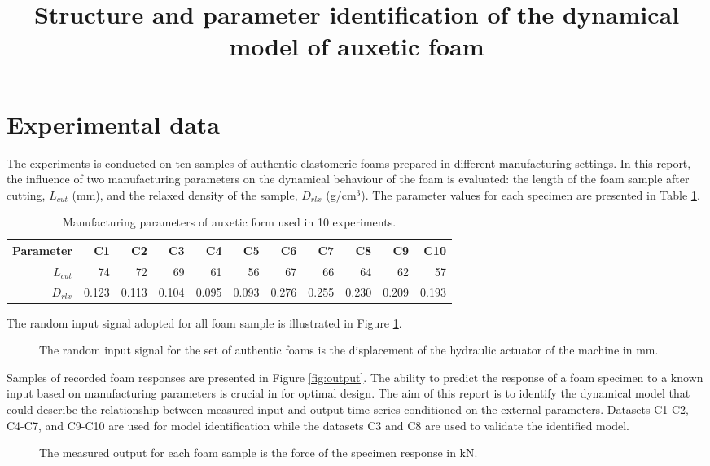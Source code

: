 \documentclass[a4paper,11pt,twoside]{article}
\title{Structure and parameter identification of the dynamical model of auxetic foam}
\theoremstyle{mytheoremstyle}
\begin{document}
	\maketitle
%	
\section{Experimental data}
\par The experiments is conducted on ten samples of authentic elastomeric foams prepared in different manufacturing settings. In this report, the influence of two manufacturing parameters on the dynamical behaviour of the foam is evaluated: the length of the foam sample after cutting, $L_{cut}$ (mm), and the relaxed density of the sample, $D_{rlx}$ (g/cm$^3$). The parameter values for each specimen are presented in Table \ref{tab:externparams}.
\begin{table}[!h]
	\centering
	\caption{Manufacturing parameters of auxetic form used in 10 experiments.}\label{tab:externparams}
	\small
	\begin{tabular}{rrrrrrrrrrr}
		Parameter  & C1 & C2 & C3 & C4 & C5 & C6 & C7 & C8 & C9 & C10 \\ 
		\hline 
		$L_{cut}$ & 74 & 72 & 69 & 61 & 56 & 67 & 66 & 64 & 62 & 57 \\ 
		$D_{rlx}$ & 0.123 & 0.113 & 0.104 & 0.095 & 0.093 & 0.276 & 0.255 & 0.230 & 0.209 & 0.193 \\ 
		\hline 
	\end{tabular}
\end{table}
The random input signal adopted for all foam sample is illustrated in Figure \ref{fig:input}. 
\begin{figure}[!h]
	\centering
	
	\caption{The random input signal for the set of authentic foams is the displacement of the hydraulic actuator of the machine in mm.}\label{fig:input}
\end{figure}
Samples of recorded foam responses are presented in  Figure \ref{fig:output}. The ability to predict the response of a foam specimen to a known input based on manufacturing parameters is crucial in for optimal design. The aim of this report is to identify the dynamical model that could describe the relationship between measured input and output time series conditioned on the external parameters. Datasets C1-C2, C4-C7, and C9-C10 are used for model identification while the datasets C3 and C8 are used to validate the identified model.
\begin{figure}[!t]
	\centering
	
	\caption{The measured output for each foam sample is the force of the specimen response in kN.}
\end{figure}\label{fig:output}
\end{document}
